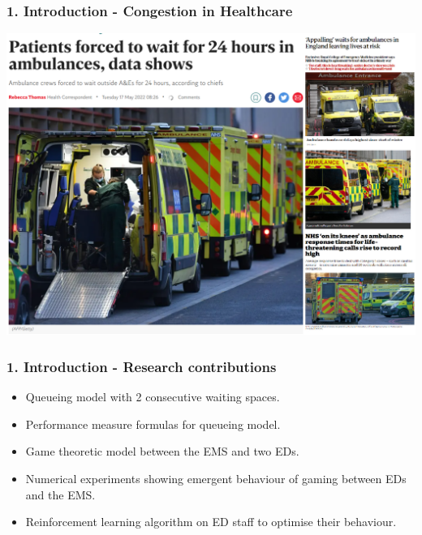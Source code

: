 \begin{frame}
    \frametitle{1. Introduction - Congestion in Healthcare}
    \centering

    \includegraphics[scale=0.3]{Bin/articles/articles.PNG}
        
\end{frame}


\begin{frame}
    \frametitle{1. Introduction - Research contributions}

    \begin{itemize}
        \item Queueing model with 2 consecutive waiting spaces.
        \item Performance measure formulas for queueing model.
        \item Game theoretic model between the EMS and two EDs.
        \item Numerical experiments showing emergent behaviour of gaming between EDs and the EMS.
        \item Reinforcement learning algorithm on ED staff to optimise their behaviour.       
    \end{itemize}

\end{frame}

